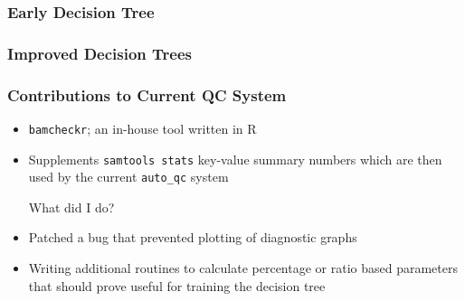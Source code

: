 \documentclass{beamer}
\begin{document}
\begin{frame}[t]
\frametitle{Early Decision Tree}
    \vskip 2.5cm
\end{frame}

\begin{frame}[t]
\frametitle{Improved Decision Trees}
\end{frame}

\begin{frame}[t]
\frametitle{Contributions to Current QC System}
\begin{itemize}
    \item \texttt{bamcheckr}; an in-house tool written in R
    \item Supplements \texttt{samtools stats} key-value summary numbers which 
        are then used by the current \texttt{auto\_qc} system

    \vskip 0.5cm

    \begin{beamerboxesrounded}[shadow=true]{}
        \begin{center}
            What did I do?
        \end{center}
    \end{beamerboxesrounded}
    \item Patched a bug that prevented plotting of diagnostic graphs
    \item Writing additional routines to calculate percentage or ratio based 
        parameters that should prove useful for training the decision tree
\end{itemize}
\end{frame}
\end{document}
